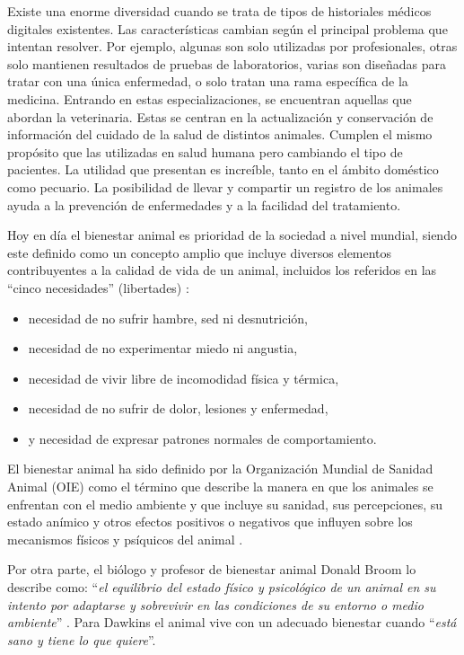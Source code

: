 Existe una enorme diversidad cuando se trata de tipos de historiales m\'edicos digitales existentes. Las caracter\'isticas cambian seg\'un el principal problema que intentan resolver. Por ejemplo, algunas son solo utilizadas por profesionales, otras solo mantienen resultados de pruebas de laboratorios, varias son diseñadas para tratar con una \'unica enfermedad, o solo tratan una rama espec\'ifica de la medicina. Entrando en estas especializaciones, se encuentran aquellas que abordan la veterinaria. Estas se centran en la actualización y conservación de informaci\'on del cuidado de la salud de distintos animales. Cumplen el mismo prop\'osito que las utilizadas en salud humana pero cambiando el tipo de pacientes. La utilidad que presentan es incre\'ible, tanto en el \'ambito dom\'estico como pecuario. La posibilidad de llevar y compartir un registro de los animales ayuda a la prevenci\'on de enfermedades y a la facilidad del tratamiento. 

Hoy en día el bienestar animal es prioridad de la sociedad a nivel mundial, siendo este definido como un concepto amplio que incluye diversos elementos  contribuyentes a la calidad de vida de un animal, incluidos los referidos en las “cinco necesidades” (libertades) :
\begin{itemize}
\item necesidad de no sufrir hambre, sed ni desnutrición,
\item necesidad de no experimentar miedo ni angustia,
\item necesidad de vivir libre de incomodidad física y térmica,
\item necesidad de no sufrir de dolor, lesiones y enfermedad,
\item y necesidad de expresar patrones normales de comportamiento.
\end{itemize}
El bienestar animal ha sido definido por la Organización Mundial de Sanidad Animal (OIE) como el término que describe la manera en que los animales se enfrentan con el medio ambiente y que incluye su sanidad, sus percepciones, su estado anímico y otros efectos positivos o negativos que influyen sobre los mecanismos físicos y psíquicos del animal .

Por otra parte, el biólogo y profesor de bienestar animal Donald Broom lo describe como: “\textit{el equilibrio del estado físico y psicológico de un animal en su intento por adaptarse y sobrevivir en las condiciones de su entorno o medio ambiente}” . Para Dawkins  el animal vive con un adecuado bienestar cuando “\textit{está sano y tiene lo que quiere}”.


